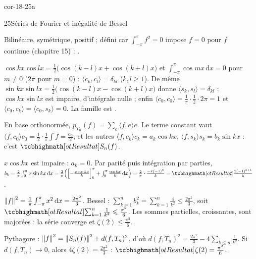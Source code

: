 
\begin{blocLivre}{cor-18-25a}
\begin{corrige}{25}{Séries de Fourier et inégalité de Bessel}
\begin{questions}
  \item Bilinéaire, symétrique, positif ; défini car $\int_{-\pi}^{\pi}f^{2}=0$
    impose $f=0$ pour $f$ continue (chapitre 15) : .
  \item $\cos kx\cos lx=\frac12\bigl(\cos(k-l)x+\cos(k+l)x\bigr)$ et
    $\int_{-\pi}^{\pi}\cos mx\,\mathrm{d}x=0$ pour $m\neq0$ ($2\pi$ pour
    $m=0$) : $\langle c_k,c_l\rangle=\delta_{kl}$ ($k,l\geqslant1$). De même
    $\sin kx\sin lx=\frac12\bigl(\cos(k-l)x-\cos(k+l)x\bigr)$ donne
    $\langle s_k,s_l\rangle=\delta_{kl}$ ; $\cos kx\sin lx$ est impaire,
    d'intégrale nulle ; enfin $\langle c_0,c_0\rangle=\frac1\pi\cdot\frac12\cdot2\pi=1$
    et $\langle c_0,c_k\rangle=\langle c_0,s_k\rangle=0$. La famille est
    .
  \item En base orthonormée, $p_{T_n}(f)=\sum_e\langle f,e\rangle e$. Le
    terme constant vaut $\langle f,c_0\rangle c_0=\frac12\cdot\frac1\pi\int f=\frac{a_0}{2}$,
    et les autres $\langle f,c_k\rangle c_k=a_k\cos kx$,
    $\langle f,s_k\rangle s_k=b_k\sin kx$ : c'est $\res{S_n(f)}$.
\end{questions}
\begin{questions}[resume]
  \item $x\cos kx$ est impaire : $a_k=0$. Par parité puis intégration par
    parties,
    $b_k=\frac2\pi\int_0^{\pi}x\sin kx\,\mathrm{d}x
    =\frac2\pi\Bigl(\Bigl[-\frac{x\cos kx}{k}\Bigr]_0^{\pi}+\int_0^{\pi}\frac{\cos kx}{k}\,\mathrm{d}x\Bigr)
    =\frac2\pi\cdot\frac{-\pi(-1)^{k}}{k}=\res{\frac{2(-1)^{k+1}}{k}}$.
  \item $\left\lVert f\right\rVert^{2}=\frac1\pi\int_{-\pi}^{\pi}x^{2}\,\mathrm{d}x=\frac{2\pi^{2}}{3}$.
    Bessel : $\sum_{k=1}^{n}b_k^{2}=\sum_{k=1}^{n}\frac4{k^{2}}\leqslant\frac{2\pi^{2}}3$,
    soit $\res{\sum_{k=1}^{n}\frac1{k^{2}}\leqslant\frac{\pi^{2}}6}$. Les
    sommes partielles, croissantes, sont majorées : la série converge et
    $\zeta(2)\leqslant\frac{\pi^{2}}6$.
  \item Pythagore : $\left\lVert f\right\rVert^{2}=\left\lVert S_n(f)\right\rVert^{2}+d(f,T_n)^{2}$, d'où
    $d(f,T_n)^{2}=\frac{2\pi^{2}}3-4\sum_{k\leqslant n}\frac1{k^{2}}$. Si
    $d(f,T_n)\to0$, alors $4\zeta(2)=\frac{2\pi^{2}}3$ :
    $\res{\zeta(2)=\frac{\pi^{2}}{6}}$.
\end{questions}
\end{corrige}
\end{blocLivre}

